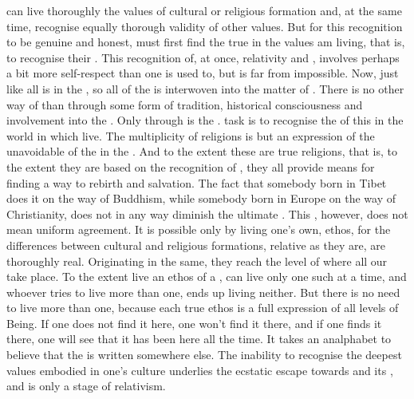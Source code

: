  can live thoroughly the values of  cultural or religious formation
and, at the same time, recognise equally thorough validity of other values.  But
for this recognition to be genuine and honest,  must first find the
true  in the values  am living, that is, to recognise
their . This recognition of, at once, relativity and
, involves perhaps a bit more self-respect than one is
used to, but is far from impossible.  Now, just like all  is
 in the , so all  of the  is
interwoven into the matter of . There is no other way of
 than through some form of tradition, historical consciousness
and involvement into the .  Only through  is the
 .  task is to recognise the
 of this  in the world in which  live. The
multiplicity of religions is but an expression of the unavoidable
 of the  in the . And to the extent
these are true religions, that is, to the extent they are based on the
recognition of , they all provide means
for finding a way to rebirth and salvation. The fact that somebody born in Tibet
does it on the way of Buddhism, while somebody born in Europe on the way of
Christianity, does not in any way diminish the ultimate . This
, however, does not mean uniform agreement. It is possible only by
living one's own,  ethos, for the differences between
cultural and religious formations, relative as they are, are thoroughly real.
Originating in the same, they reach the level of  where all our
 take place. To the extent  live an ethos of a ,
 can live only one such at a time, and whoever tries to live more than
one, ends up living neither.  But there is no need to live more than one,
because each true ethos is a full expression of all levels of Being. If one
does not find it here, one won't find it there, and if one finds it there, one
will see that it has been here all the time.  It takes an analphabet to believe
that the  is written somewhere else. The inability to recognise the
deepest values embodied in one's culture underlies the ecstatic escape towards
 and its , and is only a stage of relativism.
